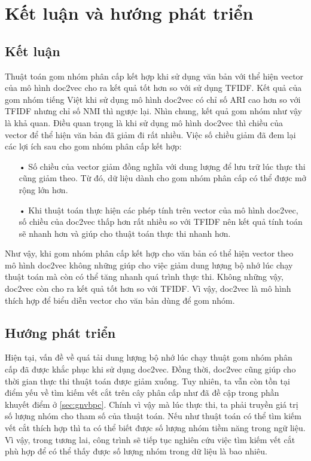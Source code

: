 \chapter{Kết luận và hướng phát triển}
\label{Chapter5}
\section{Kết luận}
Thuật toán gom nhóm phân cấp kết hợp khi sử dụng văn bản với thể hiện vector của mô hình doc2vec cho ra kết quả tốt hơn so với sử dụng TFIDF.
Kết quả của gom nhóm tiếng Việt khi sử dụng mô hình doc2vec có chỉ số ARI cao hơn so với TFIDF nhưng chỉ số NMI thì ngược lại.
Nhìn chung, kết quả gom nhóm như vậy là khả quan.
Điều quan trọng là khi sử dụng mô hình doc2vec thì chiều của vector để thể hiện văn bản đã giảm đi rất nhiều.
Việc số chiều giảm đã đem lại các lợi ích sau cho gom nhóm phân cấp kết hợp:
\begin{enumerate}
\item[•]Số chiều của vector giảm đồng nghĩa với dung lượng để lưu trữ lúc thực thi cũng giảm theo.
Từ đó, dữ liệu dành cho gom nhóm phân cấp có thể được mở rộng lớn hơn.
\item[•]Khi thuật toán thực hiện các phép tính trên vector của mô hình doc2vec, số chiều của doc2vec thấp hơn rất nhiều so với TFIDF nên kết quả tính toán sẽ nhanh hơn và giúp cho thuật toán thực thi nhanh hơn.
\end{enumerate}

Như vậy, khi gom nhóm phân cấp kết hợp cho văn bản có thể hiện vector theo mô hình doc2vec không những giúp cho việc giảm dung lượng bộ nhớ lúc chạy thuật toán mà còn có thể tăng nhanh quá trình thực thi.
Không những vậy, doc2vec còn cho ra kết quả tốt hơn so với TFIDF.
Vì vậy, doc2vec là mô hình thích hợp để biểu diễn vector cho văn bản dùng để gom nhóm.

\section{Hướng phát triển}
Hiện tại, vấn đề về quá tải dung lượng bộ nhớ lúc chạy thuật gom nhóm phân cấp đã được khắc phục khi sử dụng doc2vec.
Đồng thời, doc2vec cũng giúp cho thời gian thực thi thuật toán được giảm xuống.
Tuy nhiên, ta vẫn còn tồn tại điểm yếu về tìm kiếm vết cắt trên cây phân cấp như đã đề cập trong phần khuyết điểm ở \ref{sec:gnvbpc}.
Chính vì vậy mà lúc thực thi, ta phải truyền giá trị số lượng nhóm cho tham số của thuật toán.
Nếu như thuật toán có thể tìm kiếm vết cắt thích hợp thì ta có thể biết được số lượng nhóm tiềm năng trong ngữ liệu.
Vì vậy, trong tương lai, công trình sẽ tiếp tục nghiên cứu việc tìm kiếm vết cắt phù hợp để có thể thấy được số lượng nhóm trong dữ liệu là bao nhiêu.




